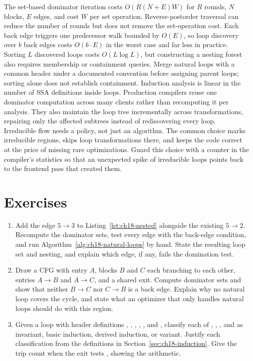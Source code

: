 The set-based dominator iteration costs $O(R(N+E)W)$ for $R$ rounds, $N$ blocks, $E$ edges, and cost $W$ per set operation.
Reverse-postorder traversal can reduce the number of rounds but does not remove the set-operation cost.
Each back edge triggers one predecessor walk bounded by $O(E)$, so loop discovery over $b$ back edges costs $O(b \cdot E)$ in the worst case and far less in practice.
Sorting $L$ discovered loops costs $O(L\log L)$, but constructing a nesting forest also requires membership or containment queries.
Merge natural loops with a common header under a documented convention before assigning parent loops; sorting alone does not establish containment.
Induction analysis is linear in the number of SSA definitions inside loops.
Production compilers reuse one dominator computation across many clients rather than recomputing it per analysis.
They also maintain the loop tree incrementally across transformations, repairing only the affected subtrees instead of rediscovering every loop.
Irreducible flow needs a policy, not just an algorithm.
The common choice marks irreducible regions, skips loop transformations there, and keeps the code correct at the price of missing rare optimizations.
Guard this choice with a counter in the compiler's statistics so that an unexpected spike of irreducible loops points back to the frontend pass that created them.

\section{Exercises}
\label{sec:ch18-exercises}

\begin{enumerate}
  \item \label{ex:ch18-find-loops}
  Add the edge $5 \to 3$ to Listing~\ref{lst:ch18-nested} alongside the existing $5 \to 2$.
  Recompute the dominator sets, test every edge with the back-edge condition, and run Algorithm~\ref{alg:ch18-natural-loops} by hand.
  State the resulting loop set and nesting, and explain which edge, if any, fails the domination test.
  \item \label{ex:ch18-irreducible}
  Draw a CFG with entry $A$, blocks $B$ and $C$ each branching to each other, entries $A \to B$ and $A \to C$, and a shared exit.
  Compute dominator sets and show that neither $B \to C$ nor $C \to B$ is a back edge.
  Explain why no natural loop covers the cycle, and state what an optimizer that only handles natural loops should do with this region.
  \item \label{ex:ch18-classify-iv}
  Given a loop with header definitions , , , , , and , classify each of , , , and  as invariant, basic induction, derived induction, or variant.
  Justify each classification from the definitions in Section~\ref{sec:ch18-induction}.
  Give the trip count when the exit tests , showing the arithmetic.
\end{enumerate}


